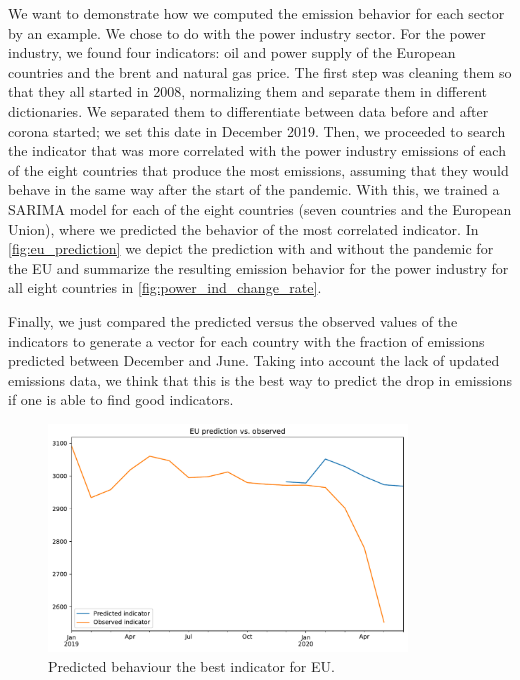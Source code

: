 We want to demonstrate how we computed the emission behavior for each sector by an example. We chose to do with the power industry sector.
For the power industry, we found four indicators: oil and power supply of the European countries and the brent and natural gas price. The first step was cleaning them so that they all started in 2008, normalizing them and separate them in different dictionaries. We separated them to differentiate between data before and after corona started; we set this date in December 2019. Then, we proceeded to search the indicator that was more correlated with the power industry emissions of each of the eight countries that produce the most \co emissions, assuming that they would behave in the same way after the start of the pandemic. With this, we trained a SARIMA model for each of the eight countries (seven countries and the European Union), where we predicted the behavior of the most correlated indicator.
In \autoref{fig:eu_prediction} we depict the prediction with and without the pandemic for the EU and summarize the resulting emission behavior for the power industry for all eight countries in \autoref{fig:power_ind_change_rate}.

Finally, we just compared the predicted versus the observed values of the indicators to generate a vector for each country with the fraction of \co emissions predicted between December and June.
Taking into account the lack of updated emissions data, we think that this is the best way to predict the drop in emissions if one is able to find good indicators.

\newpage

\begin{figure}[H]
	\centering
	\includegraphics[width=0.85\textwidth]{img/EU_prediction.pdf}
	\caption{Predicted behaviour the best indicator for EU.}
	\label{fig:eu_prediction}
\end{figure}


